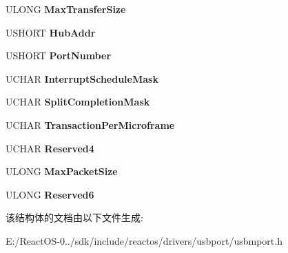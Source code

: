 \begin{DoxyCompactItemize}
\mbox{\label{struct___u_s_b_p_o_r_t___e_n_d_p_o_i_n_t___p_r_o_p_e_r_t_i_e_s_a7195528c74b0cc49d9961e7405925384}} 
U\+L\+O\+NG {\bfseries Max\+Transfer\+Size}
\item 
\mbox{\label{struct___u_s_b_p_o_r_t___e_n_d_p_o_i_n_t___p_r_o_p_e_r_t_i_e_s_a625b87fa3011c17212e8f52421a757de}} 
U\+S\+H\+O\+RT {\bfseries Hub\+Addr}
\item 
\mbox{\label{struct___u_s_b_p_o_r_t___e_n_d_p_o_i_n_t___p_r_o_p_e_r_t_i_e_s_a0bae78fd3296c6e8fc2958ac7cfe868c}} 
U\+S\+H\+O\+RT {\bfseries Port\+Number}
\item 
\mbox{\label{struct___u_s_b_p_o_r_t___e_n_d_p_o_i_n_t___p_r_o_p_e_r_t_i_e_s_a6289daabcf3f4ca84b9490f5d847483f}} 
U\+C\+H\+AR {\bfseries Interrupt\+Schedule\+Mask}
\item 
\mbox{\label{struct___u_s_b_p_o_r_t___e_n_d_p_o_i_n_t___p_r_o_p_e_r_t_i_e_s_a0caa081cde0d6fbd396fcbc60460b379}} 
U\+C\+H\+AR {\bfseries Split\+Completion\+Mask}
\item 
\mbox{\label{struct___u_s_b_p_o_r_t___e_n_d_p_o_i_n_t___p_r_o_p_e_r_t_i_e_s_a9597cfad045287c288315251d9aab354}} 
U\+C\+H\+AR {\bfseries Transaction\+Per\+Microframe}
\item 
\mbox{\label{struct___u_s_b_p_o_r_t___e_n_d_p_o_i_n_t___p_r_o_p_e_r_t_i_e_s_a2432abe29335fd8774366599324f9fa3}} 
U\+C\+H\+AR {\bfseries Reserved4}
\item 
\mbox{\label{struct___u_s_b_p_o_r_t___e_n_d_p_o_i_n_t___p_r_o_p_e_r_t_i_e_s_a16e428278831b134829251513e7eb324}} 
U\+L\+O\+NG {\bfseries Max\+Packet\+Size}
\item 
\mbox{\label{struct___u_s_b_p_o_r_t___e_n_d_p_o_i_n_t___p_r_o_p_e_r_t_i_e_s_aa89f4634398795a4668e6c9a75f63f06}} 
U\+L\+O\+NG {\bfseries Reserved6}
\end{DoxyCompactItemize}


该结构体的文档由以下文件生成\+:\begin{DoxyCompactItemize}
\item 
E\+:/\+React\+O\+S-\/0../sdk/include/reactos/drivers/usbport/usbmport.\+h\end{DoxyCompactItemize}
